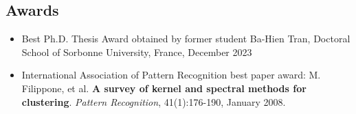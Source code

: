 \documentclass[oneside, a4paper, onecolumn, 10pt]{article}
\begin{document}

\subsection*{Awards}
\begin{itemize}
     \item Best Ph.D. Thesis Award obtained by former student Ba-Hien Tran, Doctoral School of Sorbonne University, France, December 2023
     \item 
International Association of Pattern Recognition best paper award: 
       M. Filippone, et al. %
       \textbf{A survey of kernel and spectral methods for clustering}.
       \emph{Pattern Recognition}, 41(1):176-190, January 2008.
\end{itemize}



\end{document}
